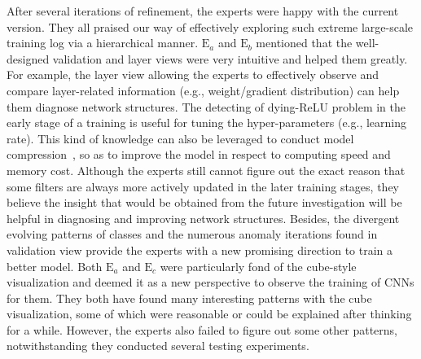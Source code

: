 \documentclass[format=acmsmall, review=false, screen=true]{acmart}
\newcommand{\ea}{{$\mathrm{E}_a$}\xspace}
\newcommand{\eb}{{$\mathrm{E}_b$}\xspace}
\newcommand{\ec}{{$\mathrm{E}_c$}\xspace}
\begin{document}
After several iterations of refinement, the experts were happy with the current version. They all praised our way of effectively exploring such extreme large-scale training log via a hierarchical manner.
\ea and \eb mentioned that the well-designed validation and layer views were very intuitive and helped them greatly. For example, the layer view allowing the experts to effectively observe and compare layer-related information (e.g., weight/gradient distribution) can help them diagnose network structures. The detecting of dying-ReLU problem in the early stage of a training is useful for tuning the hyper-parameters (e.g., learning rate). This kind of knowledge can also be leveraged to conduct model compression~\cite{han2015deep}, so as to improve the model in respect to computing speed and memory cost. Although the experts still cannot figure out the exact reason that some filters are always more actively updated in the later training stages, they believe the insight that would be obtained from the future investigation will be helpful in diagnosing and improving network structures. Besides, the divergent evolving patterns of classes and the numerous anomaly iterations found in validation view provide the experts with a new promising direction to train a better model.
Both \ea and \ec were particularly fond of the cube-style visualization and deemed it as a new perspective to observe the training of CNNs for them.
They both have found many interesting patterns with the cube visualization, some of which were reasonable or could be explained after thinking for a while.
However, the experts also failed to figure out some other patterns, notwithstanding they conducted several testing experiments.
\end{document}
